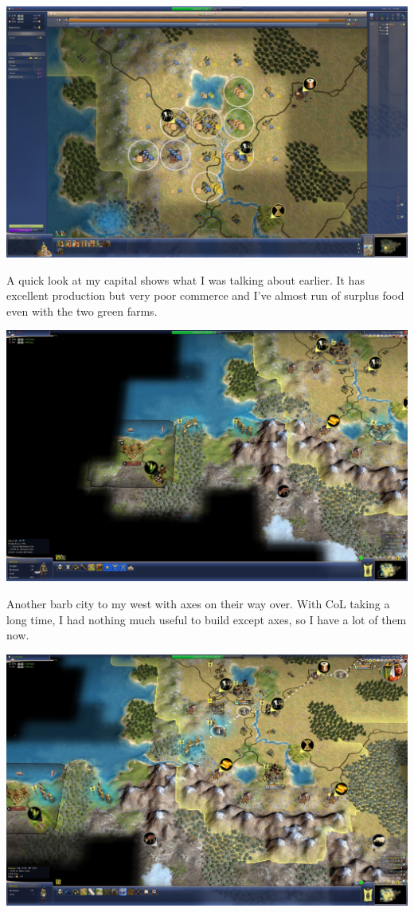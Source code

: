 \documentclass[10pt]{article}
\begin{document}
\includegraphics[width=1.0\textwidth]{91}

A quick look at my capital shows what I was talking about earlier. It has excellent production but very poor commerce
and I've almost run of surplus food even with the two green farms.

\includegraphics[width=1.0\textwidth]{92}

Another barb city to my west with axes on their way over. With CoL taking a long time, I had nothing much useful to
build except axes, so I have a lot of them now.

\includegraphics[width=1.0\textwidth]{93}
\end{document}
